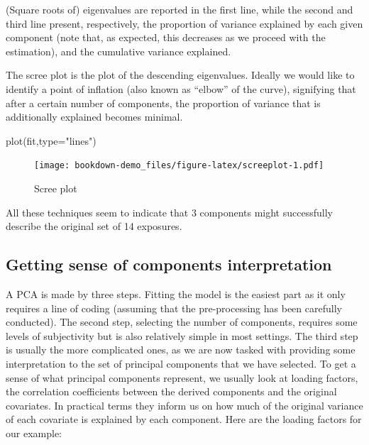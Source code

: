 \documentclass[
]{book}
\newenvironment{Shaded}{\begin{snugshade}}{\end{snugshade}}
\newcommand{\AttributeTok}[1]{\textcolor[rgb]{0.77,0.63,0.00}{#1}}
\newcommand{\FunctionTok}[1]{\textcolor[rgb]{0.00,0.00,0.00}{#1}}
\newcommand{\NormalTok}[1]{#1}
\newcommand{\StringTok}[1]{\textcolor[rgb]{0.31,0.60,0.02}{#1}}
\begin{document}
(Square roots of) eigenvalues are reported in the first line, while the second and third line present, respectively, the proportion of variance explained by each given component (note that, as expected, this decreases as we proceed with the estimation), and the cumulative variance explained.

The scree plot is the plot of the descending eigenvalues. Ideally we would like to identify a point of inflation (also known as ``elbow'' of the curve), signifying that after a certain number of components, the proportion of variance that is additionally explained becomes minimal.

\begin{Shaded}
\begin{Highlighting}[]
\FunctionTok{plot}\NormalTok{(fit,}\AttributeTok{type=}\StringTok{"lines"}\NormalTok{)}
\end{Highlighting}
\end{Shaded}

\begin{figure}
\centering
\texttt{[image: bookdown-demo\_files/figure-latex/screeplot-1.pdf]}
\caption{\label{fig:screeplot}Scree plot}
\end{figure}

All these techniques seem to indicate that 3 components might successfully describe the original set of 14 exposures.

\hypertarget{getting-sense-of-components-interpretation}{%
\subsection{Getting sense of components interpretation}\label{getting-sense-of-components-interpretation}}

A PCA is made by three steps. Fitting the model is the easiest part as it only requires a line of coding (assuming that the pre-processing has been carefully conducted). The second step, selecting the number of components, requires some levels of subjectivity but is also relatively simple in most settings. The third step is usually the more complicated ones, as we are now tasked with providing some interpretation to the set of principal components that we have selected. To get a sense of what principal components represent, we usually look at loading factors, the correlation coefficients between the derived components and the original covariates. In practical terms they inform us on how much of the original variance of each covariate is explained by each component. Here are the loading factors for our example:
\end{document}
